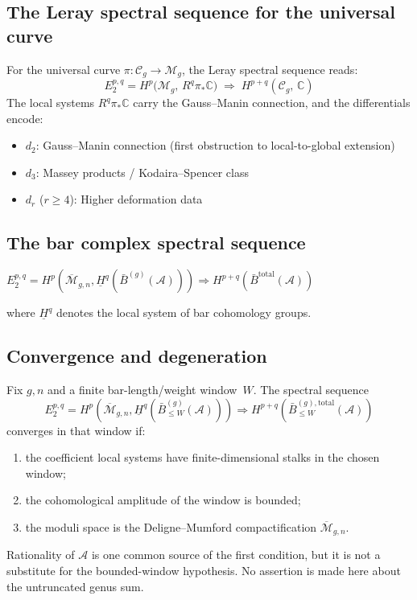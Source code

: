 \subsection{The Leray spectral sequence for the universal curve}

For the universal curve $\pi: \mathcal{C}_g \to \mathcal{M}_g$, the Leray spectral sequence reads:
\[E_2^{p,q} = H^p\bigl(\mathcal{M}_g,\, R^q\pi_*\mathbb{C}\bigr) \;\Longrightarrow\; H^{p+q}(\mathcal{C}_g,\, \mathbb{C})\]
The local systems $R^q\pi_*\mathbb{C}$ carry the Gauss--Manin connection, and the differentials encode:
\begin{itemize}
\item $d_2$: Gauss--Manin connection (first obstruction to local-to-global extension)
\item $d_3$: Massey products / Kodaira--Spencer class
\item $d_r$ ($r \geq 4$): Higher deformation data
\end{itemize}

\subsection{The bar complex spectral sequence}

$E_2^{p,q} = H^p(\overline{\mathcal{M}}_{g,n}, \underline{H}^q(\bar{B}^{(g)}(\mathcal{A}))) \Rightarrow H^{p+q}(\bar{B}^{\text{total}}(\mathcal{A}))$

where $\underline{H}^q$ denotes the local system of bar cohomology groups.

\subsection{Convergence and degeneration}

\begin{theorem}\label{thm:convergence-criterion-spectral}
Fix $g,n$ and a finite bar-length/weight window~$W$. The spectral sequence
\[
E_2^{p,q} =
H^p(\overline{\mathcal{M}}_{g,n},
\underline{H}^q(\bar{B}^{(g)}_{\le W}(\mathcal{A})))
\Rightarrow
H^{p+q}(\bar{B}^{(g),\mathrm{total}}_{\le W}(\mathcal{A}))
\]
converges in that window if:
\begin{enumerate}
\item the coefficient local systems have finite-dimensional stalks in the chosen window;
\item the cohomological amplitude of the window is bounded;
\item the moduli space is the Deligne--Mumford compactification
$\overline{\mathcal{M}}_{g,n}$.
\end{enumerate}
Rationality of $\mathcal A$ is one common source of the first
condition, but it is not a substitute for the bounded-window
hypothesis. No assertion is made here about the untruncated genus sum.
\end{theorem}

